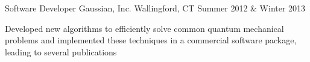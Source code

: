 


\begin{cventries}




\cventry
{Software Developer} %
{Gaussian, Inc.} %
{Wallingford, CT} %
{Summer 2012 \& Winter 2013} %
{ %
\begin{cvitems}
\item {Developed new algorithms to efficiently solve common quantum mechanical problems and implemented these techniques in a commercial software package, leading to several publications}
\end{cvitems}
}



\end{cventries}